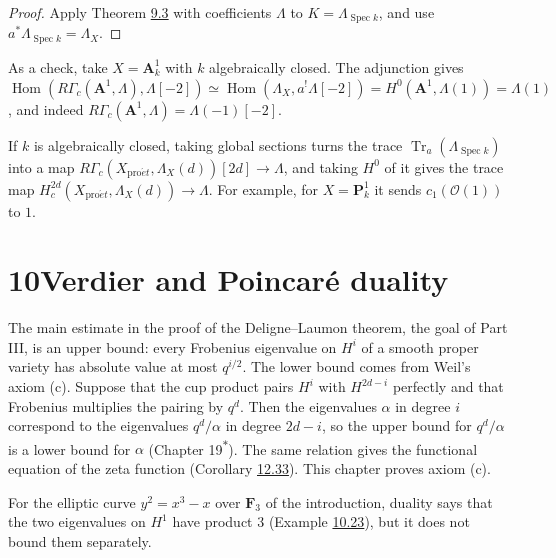 \documentclass[11pt]{article}
\newcommand{\bpout}[1]{#1\textsuperscript{\hyperlink{bp-outside}{\ensuremath{\ast}}}}
\providecommand{\Hom}{}\renewcommand{\Hom}{\operatorname{Hom}}
\begin{document}
\begin{proof}[{Proof}]\label{bp99}%
Apply Theorem \hyperref[bp11]{9.3} with coefficients \(\Lambda\) to \(K=\Lambda_{\operatorname{Spec}k}\), and use \(a^*\Lambda_{\operatorname{Spec}k}=\Lambda_X\).
\end{proof}

\label{bp100}%
As a check, take \(X=\mathbf A^1_k\) with \(k\) algebraically closed. The adjunction gives \(\Hom(R\Gamma_c(\mathbf A^1,\Lambda),\Lambda[-2])\simeq\Hom(\Lambda_X,a^!\Lambda[-2])
=H^0(\mathbf A^1,\Lambda(1))=\Lambda(1)\), and indeed \(R\Gamma_c(\mathbf A^1,\Lambda)=\Lambda(-1)[-2]\).

If \(k\) is algebraically closed, taking global sections turns the trace \(\operatorname{Tr}_a(\Lambda_{\operatorname{Spec}k})\) into a map \(R\Gamma_c(X_{\mathrm{pro}\acute{e}t},\Lambda_X(d))[2d]\to\Lambda\), and taking \(H^0\) of it gives the trace map \(H_c^{2d}(X_{\mathrm{pro}\acute{e}t},\Lambda_X(d))\to\Lambda\). For example, for \(X=\mathbf P^1_k\) it sends \(c_1(\mathcal O(1))\) to \(1\).



\section*{\texorpdfstring{10\quad Verdier and Poincaré duality}{10 Verdier and Poincaré duality}}
\label{bp101}%
\label{bp102}%
The main estimate in the proof of the Deligne–Laumon theorem, the goal of Part III, is an upper bound: every Frobenius eigenvalue on \(H^i\) of a smooth proper variety has absolute value at most \(q^{i/2}\). The lower bound comes from Weil's axiom (c). Suppose that the cup product pairs \(H^i\) with \(H^{2d-i}\) perfectly and that Frobenius multiplies the pairing by \(q^d\). Then the eigenvalues \(\alpha\) in degree \(i\) correspond to the eigenvalues \(q^d/\alpha\) in degree \(2d-i\), so the upper bound for \(q^d/\alpha\) is a lower bound for \(\alpha\) (Chapter \bpout{19}). The same relation gives the functional equation of the zeta function (Corollary \hyperref[bp325]{12.33}). This chapter proves axiom (c).

For the elliptic curve \(y^2=x^3-x\) over \(\mathbf F_3\) of the introduction, duality says that the two eigenvalues on \(H^1\) have product \(3\) (Example \hyperref[bp169]{10.23}), but it does not bound them separately.
\end{document}
